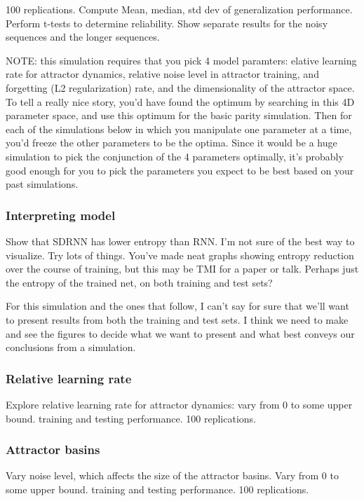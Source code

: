 \documentclass{article}
\begin{document}
100 replications. Compute Mean, median, std dev of generalization
performance. Perform t-tests to determine reliability.
Show separate results for the noisy sequences and the longer sequences.

NOTE: this simulation requires that you pick 4 model paramters:
elative learning rate for attractor dynamics, relative noise level in 
attractor training, and forgetting (L2 regularization) rate, and 
the dimensionality of the attractor space.  To tell a really nice story,
you'd have found the optimum by searching in this 4D parameter space, and
use this optimum for the basic parity simulation. Then for each of the
simulations below in which you manipulate one parameter at a time, you'd
freeze the other parameters to be the optima. Since it would be a huge
simulation to pick the conjunction of the 4 parameters optimally, it's
probably good enough for you to pick the parameters you expect to be best
based on your past simulations.

\subsubsection{Interpreting model}

Show that SDRNN has lower entropy than RNN. I'm not sure of the best
way to visualize. Try lots of things. You've made neat graphs showing entropy
reduction over the course of training, but this may be TMI for a paper or
talk. Perhaps just the entropy of the trained net, on both training and test
sets? 

For this simulation and the ones that follow, I can't say for sure that
we'll want to present results from both the training and test sets. I think we
need to make and see the figures to decide what we want to present and what
best conveys our conclusions from a simulation.

\subsubsection{Relative learning rate}
Explore relative learning rate for attractor dynamics: vary from 0 to
some upper bound. training and testing performance. 100 replications.

\subsubsection{Attractor basins}  
Vary noise level, which affects the size of the attractor basins.
Vary from 0 to some upper bound. training and testing performance. 100 
replications.
\end{document}
